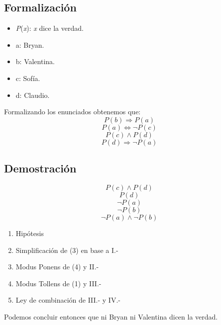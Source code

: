 \documentclass[letterpaper,10pt]{article}
\begin{document}
\subsection{Formalizaci\'on}
\begin{minipage}[t]{0.4\textwidth}
\begin{itemize}
    \item \textit{P}(\textit{x}): \textit{x} dice la verdad.
    \item a: Bryan.
    \item b: Valentina.
    \item c: Sof\'ia.
    \item d: Claudio.
\end{itemize}
\end{minipage}
\begin{minipage}[t]{0.5\textwidth}
Formalizando los enunciados obtenemos que:
\begin{equation}
    P(b) \Rightarrow P(a)
\end{equation}
\begin{equation}
    P(a) \Leftrightarrow \neg P(c)
\end{equation}
\begin{equation}
    P(c) \wedge  P(d)
\end{equation}
\begin{equation}
    P(d) \Rightarrow \neg P(a)
\end{equation}
\end{minipage}

\subsection{Demostraci\'on}
\begin{minipage}[c]{0.4\textwidth}
\begin{equation*}
    P(c) \wedge  P(d)
\end{equation*}
\begin{equation*}
    P(d)
\end{equation*}
\begin{equation*}
    \neg P(a)
\end{equation*}
\begin{equation*}
    \neg P(b)
\end{equation*}
\begin{equation*}
    \neg P(a) \wedge \neg P(b)
\end{equation*}
\end{minipage}
\begin{minipage}[c]{0.5\textwidth}
\begin{enumerate}[I{.-}]
    \item Hip\'otesis
    \item Simplificaci\'on de (3) en base a I.-
    \item Modus Ponens de (4) y II.-
    \item Modus Tollens de (1) y III.-
    \item Ley de combinaci\'on de III.- y IV.-
\end{enumerate}
\end{minipage}
\vspace{0.3cm}
\newline
Podemos concluir entonces que ni Bryan ni Valentina dicen la verdad.
\end{document}
